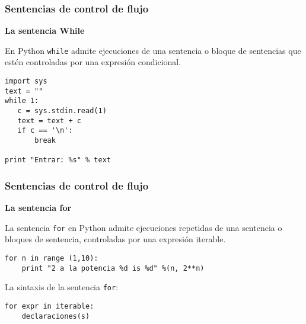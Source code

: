 \documentclass[10pt]{beamer}
\begin{document}
\begin{frame}[fragile]
\frametitle{Sentencias de control de flujo}
\textbf{La sentencia While}

\vspace{0.2cm}

En Python \texttt{while} admite ejecuciones de una sentencia o bloque de sentencias que est\'en controladas por una expresi\'on condicional.

\vspace{0.2cm}

\begin{lstlisting}
import sys 
text = ""
while 1:
   c = sys.stdin.read(1)
   text = text + c
   if c == '\n':
       break

print "Entrar: %s" % text
\end{lstlisting}
\end{frame}

\begin{frame}[fragile]
\frametitle{Sentencias de control de flujo}

\textbf{La sentencia for}

\vspace{0.2cm}

La sentencia \texttt{for} en Python admite ejecuciones repetidas de una sentencia o bloques de sentencia, controladas por una expresi\'on iterable.

\vspace{0.2cm}

\begin{lstlisting}
for n in range (1,10):
    print "2 a la potencia %d is %d" %(n, 2**n)
\end{lstlisting}


\vspace{0.2cm}

La sintaxis de la sentencia \texttt{for}:

\vspace{0.2cm}

\begin{lstlisting}
for expr in iterable:
    declaraciones(s)
\end{lstlisting}
\end{frame}
\end{document}
